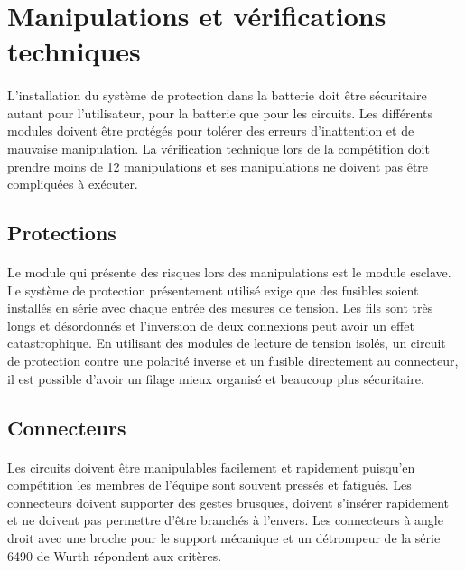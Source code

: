 \section{Manipulations et vérifications techniques}
\paragraph*{}
L'installation du système de protection dans la batterie doit être sécuritaire autant pour l'utilisateur, pour la batterie que pour les circuits. Les différents modules doivent être protégés pour tolérer des erreurs d'inattention et de mauvaise manipulation. La vérification technique lors de la compétition doit prendre moins de 12 manipulations et ses manipulations ne doivent pas être compliquées à exécuter.

	\subsection{Protections}
	\paragraph*{}
	Le module qui présente des risques lors des manipulations est le module esclave. Le système de protection présentement utilisé exige que des fusibles soient installés en série avec chaque entrée des mesures de tension. Les fils sont très longs et désordonnés et l'inversion de deux connexions peut avoir un effet catastrophique. En utilisant des modules de lecture de tension isolés, un circuit de protection contre une polarité inverse et un fusible directement au connecteur, il est possible d'avoir un filage mieux organisé et beaucoup plus sécuritaire.

	\subsection{Connecteurs}
	\paragraph*{}
	Les circuits doivent être manipulables facilement et rapidement puisqu'en compétition les membres de l'équipe sont souvent pressés et fatigués. Les connecteurs doivent supporter des gestes brusques, doivent s'insérer rapidement et ne doivent pas permettre d'être branchés à l'envers. Les connecteurs à angle droit avec une broche pour le support mécanique et un détrompeur de la série 6490 de Wurth répondent aux critères.

